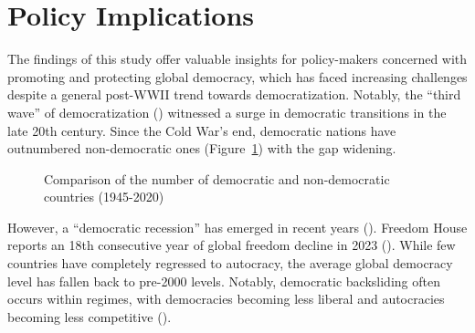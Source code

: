 \documentclass[
  12pt,
]{report}
\begin{document}
\section{Policy Implications}\label{policy-implications}

The findings of this study offer valuable insights for policy-makers
concerned with promoting and protecting global democracy, which has
faced increasing challenges despite a general post-WWII trend towards
democratization. Notably, the ``third wave'' of democratization
()
witnessed a surge in democratic transitions in the late 20th century.
Since the Cold War's end, democratic nations have outnumbered
non-democratic ones (Figure~\ref{fig-democracy}) with the gap widening.

\begin{figure}


\caption{\label{fig-democracy}Comparison of the number of democratic and
non-democratic countries (1945-2020)}

\end{figure}%

However, a ``democratic recession'' has emerged in recent years
(). Freedom House reports an
18th consecutive year of global freedom decline in 2023
(). While few
countries have completely regressed to autocracy, the average global
democracy level has fallen back to pre-2000 levels. Notably, democratic
backsliding often occurs within regimes, with democracies becoming less
liberal and autocracies becoming less competitive
().
\end{document}
